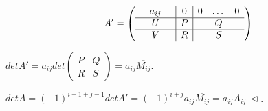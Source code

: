 \begin{equation*} A' = 
\left(
\begin{array}{ccc|c|ccc}
	 & a_{ij} &  & 0  & 0 & \dots & 0 \\
  \hline
  & U & & P & & Q & \\
  \hline
  & V & & R & & S &
\end{array}
\right)
\end{equation*}

\vspace{\baselineskip}
$detA' = a_{ij}det \left(
\begin{array}{c|c}
  P & Q \\
  \hline
  R & S
\end{array}
\right) = a_{ij} \overline{M_{ij}}$.

\vspace{\baselineskip}
$det A = (-1)^{i-1+j-1} det A' = (-1)^{i+j} a_{ij}\overline{M_{ij}} = a_{ij} A_{ij} \ \lhd$.

